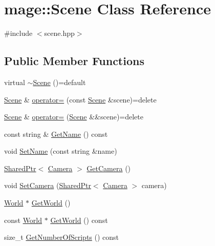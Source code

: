\hypertarget{classmage_1_1_scene}{}\section{mage\+:\+:Scene Class Reference}
\label{classmage_1_1_scene}


{\ttfamily \#include $<$scene.\+hpp$>$}

\subsection*{Public Member Functions}
\begin{DoxyCompactItemize}
\item 
virtual \hyperlink{classmage_1_1_scene_a0db784091e75a472b20088ba7f1c2b26}{$\sim$\+Scene} ()=default
\item 
\hyperlink{classmage_1_1_scene}{Scene} \& \hyperlink{classmage_1_1_scene_a2c25c0fedc0230771d8c00a8288a69ce}{operator=} (const \hyperlink{classmage_1_1_scene}{Scene} \&scene)=delete
\item 
\hyperlink{classmage_1_1_scene}{Scene} \& \hyperlink{classmage_1_1_scene_a400926762670c9cd9b6d456291600f53}{operator=} (\hyperlink{classmage_1_1_scene}{Scene} \&\&scene)=delete
\item 
const string \& \hyperlink{classmage_1_1_scene_a251ff8f6ce0da5c55ee31e3450b5fb9a}{Get\+Name} () const
\item 
void \hyperlink{classmage_1_1_scene_a9b7c1c2f84cc3b3c5ff3de4f29d830e9}{Set\+Name} (const string \&name)
\item 
\hyperlink{namespacemage_a1e01ae66713838a7a67d30e44c67703e}{Shared\+Ptr}$<$ \hyperlink{classmage_1_1_camera}{Camera} $>$ \hyperlink{classmage_1_1_scene_a8845b10d7c51aa8ba824b694556ca84d}{Get\+Camera} ()
\item 
void \hyperlink{classmage_1_1_scene_a57718151e0102306b3abb22da45ae27a}{Set\+Camera} (\hyperlink{namespacemage_a1e01ae66713838a7a67d30e44c67703e}{Shared\+Ptr}$<$ \hyperlink{classmage_1_1_camera}{Camera} $>$ camera)
\item 
\hyperlink{classmage_1_1_world}{World} $\ast$ \hyperlink{classmage_1_1_scene_abade558e953a062b5040f48d8e7371f4}{Get\+World} ()
\item 
const \hyperlink{classmage_1_1_world}{World} $\ast$ \hyperlink{classmage_1_1_scene_a0438504884c566e0d6264436b78ee764}{Get\+World} () const
\item 
size\+\_\+t \hyperlink{classmage_1_1_scene_a799ac8ddd90d24f6c3c208942e4f159c}{Get\+Number\+Of\+Scripts} () const

\end{DoxyCompactItemize}
